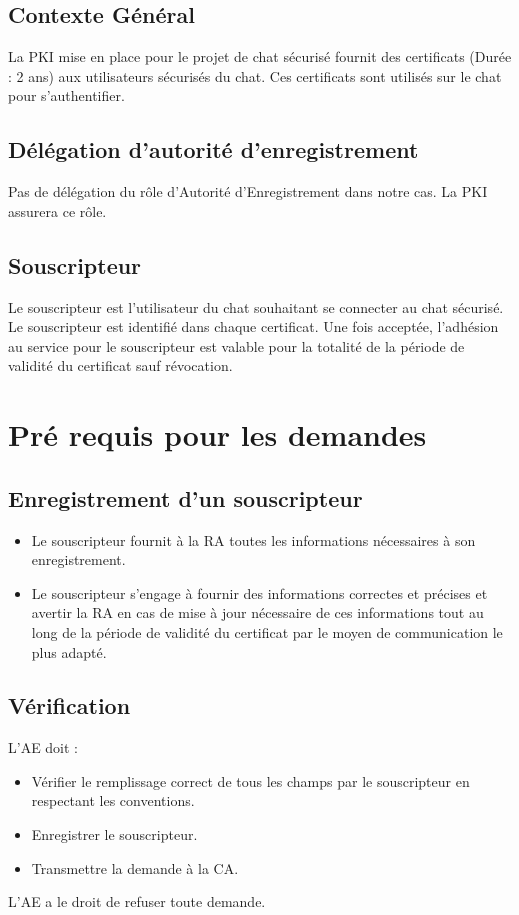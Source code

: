 \documentclass[a4paper,11pt,french]{book}
\begin{document}
\subsection{Contexte Général}
La PKI mise en place pour le projet de chat sécurisé fournit des certificats (Durée : 2 ans) aux utilisateurs sécurisés du chat.
Ces certificats sont utilisés sur le chat pour s'authentifier.

\subsection{Délégation d'autorité d'enregistrement}
Pas de délégation du rôle d’Autorité d’Enregistrement dans notre cas. La PKI assurera ce rôle.

\subsection{Souscripteur}
Le souscripteur est l’utilisateur du chat souhaitant se connecter au chat sécurisé. Le souscripteur est identifié dans chaque certificat. Une fois acceptée, l’adhésion au service pour le souscripteur est valable pour la totalité de la période de validité du certificat sauf révocation.

\section{Pré requis pour les demandes}
\subsection{Enregistrement d'un souscripteur}
\begin{itemize}
\item Le souscripteur fournit à la RA toutes les informations nécessaires à son enregistrement. 
\item Le souscripteur s'engage à fournir des informations correctes et précises et avertir la RA en cas de mise à jour nécessaire de ces informations tout au long de la période de validité du certificat par le moyen de communication le plus adapté.
\end{itemize}

\subsection{Vérification}
L’AE doit :
\begin{itemize}
\item Vérifier le remplissage correct de tous les champs par le souscripteur en respectant les conventions.
\item Enregistrer le souscripteur.
\item Transmettre la demande à la CA.
\end{itemize}
L’AE a le droit de refuser toute demande.
\end{document}

